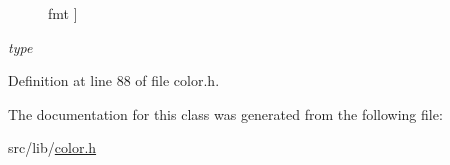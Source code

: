 \begin{Desc}
\begin{description}
{fmt\hypertarget{classcv_1_1DataType_3_1_1tlz_1_1ycbcr__color_01_4_a7e85996b9a9f62395e4de4eb157fa726a5131e7f2c36c6807ddb3dc8c5c5889a7}{}\label{classcv_1_1DataType_3_1_1tlz_1_1ycbcr__color_01_4_a7e85996b9a9f62395e4de4eb157fa726a5131e7f2c36c6807ddb3dc8c5c5889a7}
}]\item[{\em 
type\hypertarget{classcv_1_1DataType_3_1_1tlz_1_1ycbcr__color_01_4_a7e85996b9a9f62395e4de4eb157fa726a62269604f7bcbfaab79c36dc0c87c25c}{}\label{classcv_1_1DataType_3_1_1tlz_1_1ycbcr__color_01_4_a7e85996b9a9f62395e4de4eb157fa726a62269604f7bcbfaab79c36dc0c87c25c}
}]\end{description}
\end{Desc}


Definition at line 88 of file color.\+h.



The documentation for this class was generated from the following file\+:\begin{DoxyCompactItemize}
\item 
src/lib/\hyperlink{color_8h}{color.\+h}\end{DoxyCompactItemize}

